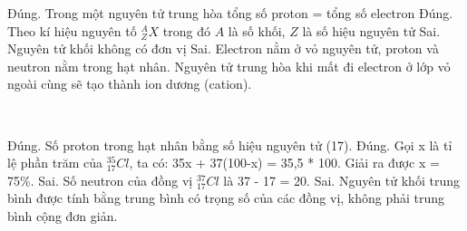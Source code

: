 \def\writeANS{\TLdung{A}\TLdung{B}\TLsai{C}\TLsai{D}}
\begin{loigiaiex}{17}
  \begin {itemchoice} \itemch Đúng. Trong một nguyên tử trung hòa tổng số proton = tổng số electron \itemch Đúng. Theo kí hiệu nguyên tố ${}^A_ZX$ trong đó $A$ là số khối, $Z$ là số hiệu nguyên tử \itemch Sai. Nguyên tử khối không có đơn vị \itemch Sai. Electron nằm ở vỏ nguyên tử, proton và neutron nằm trong hạt nhân. Nguyên tử trung hòa khi mất đi electron ở lớp vỏ ngoài cùng sẽ tạo thành ion dương (cation). \end {itemchoice}  \phantom {a}\hfill { \faKey ~\writeANS }
\end{loigiaiex}
\def\writeANS{\TLsai{C}\TLsai{D}}
\begin{loigiaiex}{18}
  \begin {itemchoice} \itemch Đúng. Số proton trong hạt nhân bằng số hiệu nguyên tử (17). \itemch Đúng. Gọi x là tỉ lệ phần trăm của ${}^{35}_{17}Cl$, ta có: 35x + 37(100-x) = 35,5 * 100. Giải ra được x = 75\%. \itemch Sai. Số neutron của đồng vị ${}^{37}_{17}Cl$ là 37 - 17 = 20. \itemch Sai. Nguyên tử khối trung bình được tính bằng trung bình có trọng số của các đồng vị, không phải trung bình cộng đơn giản. \end {itemchoice}  \phantom {a}\hfill { \faKey ~\writeANS }
\end{loigiaiex}
